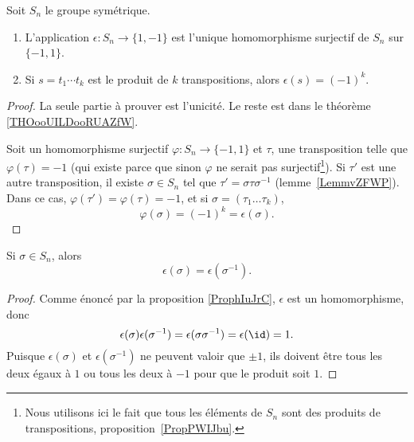 \begin{proposition}  \label{ProphIuJrC}
	Soit \( S_n\) le groupe symétrique.
	\begin{enumerate}
		\item       \label{ITEMooBQKUooFTkvSu}
		      L'application \( \epsilon\colon S_n\to \{ 1,-1 \}\) est l'unique homomorphisme surjectif de \( S_n\) sur \( \{ -1,1 \}\).
		\item
		      Si \( s=t_1\cdots t_k\) est le produit de \( k\) transpositions, alors \( \epsilon(s)=(-1)^k\).
	\end{enumerate}
\end{proposition}

\begin{proof}
	La seule partie à prouver est l'unicité. Le reste est dans le théorème \ref{THOooUILDooRUAZfW}.

	Soit un homomorphisme surjectif \( \varphi\colon S_n\to \{ -1,1 \}\) et \( \tau\), une transposition telle que \( \varphi(\tau)=-1\) (qui existe parce que sinon \( \varphi\) ne serait pas surjectif\footnote{Nous utilisons ici le fait que tous les éléments de \( S_n\) sont des produits de transpositions, proposition~\ref{PropPWIJbu}.}). Si \( \tau'\) est une autre transposition, il existe \( \sigma\in S_n\) tel que \( \tau'=\sigma\tau\sigma^{-1}\) (lemme~\ref{LemmvZFWP}). Dans ce cas, \( \varphi(\tau')=\varphi(\tau)=-1\), et si \( \sigma=(\tau_1\ldots \tau_k) \),
	\begin{equation}
		\varphi(\sigma)=(-1)^k=\epsilon(\sigma).
	\end{equation}
\end{proof}

\begin{corollary}       \label{CORooZLUKooBOhUPG}
	Si \( \sigma\in S_n\), alors
	\begin{equation}
		\epsilon(\sigma)=\epsilon(\sigma^{-1}).
	\end{equation}
\end{corollary}

\begin{proof}
	Comme énoncé par la proposition \ref{ProphIuJrC}, \( \epsilon\) est un homomorphisme, donc
	\begin{equation}
		\epsilon(\sigma)\epsilon(\sigma^{-1})=\epsilon(\sigma\sigma^{-1})=\epsilon(\id)=1.
	\end{equation}
	Puisque \( \epsilon(\sigma)\) et \( \epsilon(\sigma^{-1})\) ne peuvent valoir que \( \pm1\), ils doivent être tous les deux égaux à \( 1\) ou tous les deux à \( -1\) pour que le produit soit \( 1\).
\end{proof}


